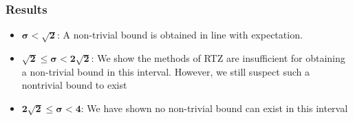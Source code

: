\documentclass[10pt, compress]{beamer}
\begin{document}
\begin{frame}[fragile]
  \frametitle{Results}
\begin{itemize}
\item $\boldsymbol{\sigma<\sqrt{2}}$: A non-trivial bound is obtained in line with expectation. \\

\item $\boldsymbol{\sqrt{2} \leq \sigma < 2\sqrt{2}}$: We show the methods of RTZ are insufficient for obtaining a non-trivial bound in this interval. However, we still suspect such a nontrivial bound to exist\\

\item $\boldsymbol{2\sqrt{2} \leq \sigma < 4}$: We have shown no non-trivial bound can exist in this interval
\end{itemize}
\end{frame}

\end{document}
